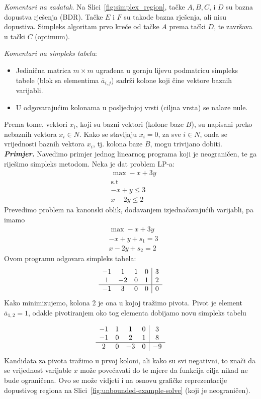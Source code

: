 \documentclass[a4paper, utf8, 11pt, colorlinks]{book}
\begin{document}
 \emph{Komentari na zadatak}. Na Slici~\ref{fig:simplex_region}, tačke $A, B, C$, i $D$ su bazna dopustva rješenja (BDR). Tačke $E$ i $F$ su takođe bazna rješenja, ali nisu dopustiva. Simpleks algoritam prvo kreće od tačke $A$ prema tački $D$, te završava u tački $C$ (optimum).
 
 \emph{Komentari na simpleks tabelu}:
 \begin{itemize}
     \item Jedinična matrica $m \times m$   ugrađena u gornju lijevu podmatricu simpleks tabele (blok sa elementima $\overline{a}_{i,j}$) sadrži kolone koji čine vektore baznih varijabli.
     \item U odgovarajućim kolonama u posljednjoj vrsti (ciljna vrsta) se nalaze nule.
 \end{itemize}
 Prema tome, vektori $x_i$, koji su bazni vektori (kolone baze $B$), su napisani preko nebaznih vektora $x_i \in N$. Kako se stavljaju $x_i  = 0$, za sve $i \in N$, onda se  vrijednosti baznih vektora $x_i$, tj. kolona baze $B$, mogu trivijano dobiti.
 \vspace{1cm}\\
 \emph{\textbf{Primjer.}} Navedimo primjer jednog linearnog programa koji je neograničen, te ga riješimo simpleks metodom. 
  Neka je dat problem LP-a:
  \begin{align*}
  	  &\max -x + 3y \\
  	  & \mbox{s.t} \nonumber \\
  	  & -x + y \leq 3 \\
  	  & x - 2y \leq 2 
  \end{align*}
 Prevedimo problem na kanonski oblik, dodavanjem izjednačavajućih varijabli, pa imamo 
 \begin{align*}
      &\max -x + 3y \\
     & -x + y + s_1 = 3 \\
     & x - 2y + s_2 = 2  
 \end{align*}
Ovom programu odgovara simpleks tabela:
$$\begin{array}{cccc| c} 
	   -1 & 1  & 1 & 0 & 3 \\
	    1 & -2 & 0 & 1 & 2 \\ \hline
	   -1 & 3  & 0 & 0 & 0  
\end{array}$$
Kako minimizujemo,  kolona 2 je ona u kojoj tražimo pivota. Pivot je element 
$\overline{a}_{1, 2} = 1$, odakle pivotiranjem oko tog elementa dobijamo novu simpleks tabelu 

$$\begin{array}{cccc| c} 
		   -1 & 1  & 1  &  0 & 3 \\
		   -1 & 0  & 2  &  1 & 8 \\ \hline
		   2  & 0  & -3 &  0 & -9 \\
\end{array}$$
Kandidata za pivota tražimo u prvoj koloni, ali kako su svi negativni, to znači da se 
vrijednost  varijable $x$  može povećavati do te mjere da funkcija cilja nikad ne bude ograničena. 
Ovo se može vidjeti i na osnovu grafičke reprezentacije dopustivog regiona na Slici~\ref{fig:unbounded-example-solve} (koji je neograničen). 
\end{document}
